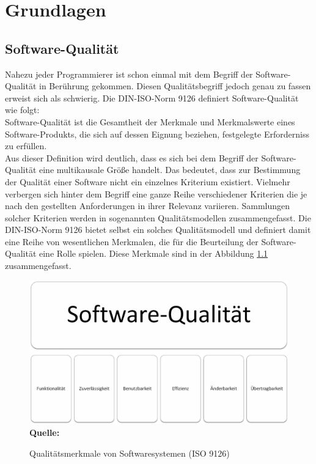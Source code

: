 \chapter{Grundlagen}
\label{sec:grundlagen}


\section{Software-Qualität}
\label{sec:softwarequalität}

Nahezu jeder Programmierer ist schon einmal mit dem Begriff der Software-Qualität in Berührung gekommen. Diesen Qualitätsbegriff jedoch genau zu fassen erweist sich als schwierig.
Die DIN-ISO-Norm 9126 definiert Software-Qualität wie folgt:
\\
\glqq Software-Qualität ist die Gesamtheit der Merkmale und Merkmalswerte eines Software-Produkts, die sich auf dessen Eignung beziehen, festgelegte Erforderniss zu erfüllen.\grqq \cite{iso/iec_iso/iec_2001}
\\
Aus dieser Definition wird deutlich, dass es sich bei dem Begriff der Software-Qualität eine multikausale Größe handelt. Das bedeutet, dass zur Bestimmung der Qualität einer Software nicht ein einzelnes Kriterium existiert. Vielmehr verbergen sich hinter dem Begriff eine ganze Reihe verschiedener Kriterien die je nach den gestellten Anforderungen in ihrer Relevanz variieren.\cite[vgl. S.6 ff.]{hoffmann_software-qualitat_2013}
Sammlungen solcher Kriterien werden in sogenannten Qualitätsmodellen zusammengefasst. Die DIN-ISO-Norm 9126 bietet selbst ein solches Qualitätsmodell und definiert damit eine Reihe von wesentlichen Merkmalen, die für die Beurteilung der Software-Qualität eine Rolle spielen. Diese Merkmale sind in der Abbildung \ref{fig:qualitaetsmerkmaleVonSoftwaresystemen} zusammengefasst.
\begin{figure}[htb]
  \centering  
  \includegraphics[scale=0.6]{img/softwarequalitaet9126.png}\\
  \footnotesize\sffamily\textbf{Quelle:} \cite{iso/iec_iso/iec_2001}
  \caption{Qualitätsmerkmale von Softwaresystemen (ISO 9126)}
  \label{fig:qualitaetsmerkmaleVonSoftwaresystemen}
\end{figure}
